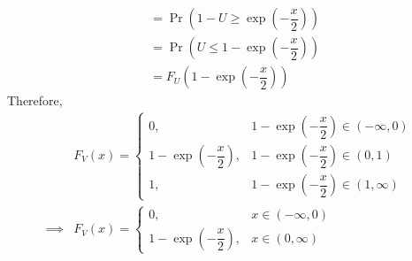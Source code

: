 \documentclass[journal,12pt,twocolumn]{IEEEtran}
\numberwithin{equation}{section}
\renewcommand\thesection{\arabic{section}}
\providecommand{\pr}[1]{\ensuremath{\Pr\left(#1\right)}}
\begin{document}
\begin{enumerate}[label=\thesection.\arabic*,ref=\thesection.\theenumi]
\begin{align}
                     & = \pr{1-U \geq	\exp{\left(-\dfrac{x}{2}\right)}}        \\
                     & = \pr{U \leq 1 - \exp{\left(-\dfrac{x}{2}\right)}}     \\
                     & = F_U\left(1 - \exp{\left(-\dfrac{x}{2}\right)}\right)
          \end{align}
          Therefore,
          \begin{align}
                       & F_V(x) =
              \begin{cases}
                  0,                                    & 1 - \exp{\left(-\dfrac{x}{2}\right)} \in (-\infty,0) \\
                  1 - \exp{\left(-\dfrac{x}{2}\right)}, & 1 - \exp{\left(-\dfrac{x}{2}\right)} \in (0,1)       \\
                  1,                                    & 1 - \exp{\left(-\dfrac{x}{2}\right)} \in (1, \infty)
              \end{cases} \\
              \implies & F_V(x) =
              \begin{cases}
                  0,                                    & x \in (-\infty,0) \\
                  1 - \exp{\left(-\dfrac{x}{2}\right)}, & x \in (0,\infty)
              \end{cases}
          \end{align}
\end{enumerate}
\end{document}
